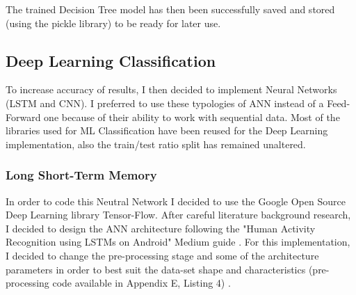 The trained Decision Tree model has then been successfully saved and stored (using the pickle library) to be ready for later use.

\subsection{Deep Learning Classification}
To increase accuracy of results, I then decided to implement Neural Networks (LSTM and CNN). I preferred to use these typologies of ANN instead of a Feed-Forward one because of their ability to work with sequential data. Most of the libraries used for ML Classification have been reused for the Deep Learning implementation, also the train/test ratio split has remained unaltered.

\subsubsection{Long Short-Term Memory}
In order to code this Neutral Network I decided to use the Google Open Source Deep Learning library Tensor-Flow. After careful literature background research, I decided to design the ANN architecture following the "Human Activity Recognition using LSTMs on Android" Medium guide \cite{android}. For this implementation, I decided to change the pre-processing stage and some of the architecture parameters in order to best suit the data-set shape and characteristics (pre-processing code available in Appendix E, Listing 4) . 



